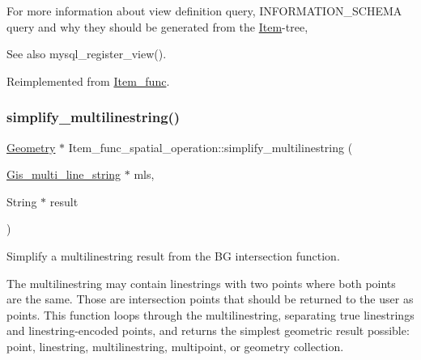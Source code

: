 For more information about view definition query, I\+N\+F\+O\+R\+M\+A\+T\+I\+O\+N\+\_\+\+S\+C\+H\+E\+MA query and why they should be generated from the \mbox{\hyperlink{classItem}{Item}}-\/tree, \begin{DoxySeeAlso}{See also}
mysql\+\_\+register\+\_\+view(). 
\end{DoxySeeAlso}


Reimplemented from \mbox{\hyperlink{classItem__func_afb302ee25d4721ace27d3f5053d4ee41}{Item\+\_\+func}}.

\mbox{\label{classItem__func__spatial__operation_ada24827906646fb03027634bdd613b4b}} 
\subsubsection{\texorpdfstring{simplify\+\_\+multilinestring()}{simplify\_multilinestring()}}
{\footnotesize\ttfamily \mbox{\hyperlink{classGeometry}{Geometry}} $\ast$ Item\+\_\+func\+\_\+spatial\+\_\+operation\+::simplify\+\_\+multilinestring (\begin{DoxyParamCaption}\item[{\mbox{\hyperlink{classGis__multi__line__string}{Gis\+\_\+multi\+\_\+line\+\_\+string}} $\ast$}]{mls,  }\item[{String $\ast$}]{result }\end{DoxyParamCaption})\hspace{0.3cm}{\ttfamily [protected]}}

Simplify a multilinestring result from the BG intersection function.

The multilinestring may contain linestrings with two points where both points are the same. Those are intersection points that should be returned to the user as points. This function loops through the multilinestring, separating true linestrings and linestring-\/encoded points, and returns the simplest geometric result possible\+: point, linestring, multilinestring, multipoint, or geometry collection.


